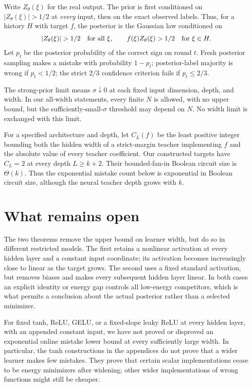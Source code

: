\documentclass[11pt]{article}
\theoremstyle{remark}\newtheorem{remark}[theorem]{Remark}
\begin{document}
Write $Z_\theta(\xi)$ for the real output. The prior is first conditioned
on $|Z_\theta(\xi)|>1/2$ at \emph{every} input, then on the exact observed
labels. Thus, for a history $H$ with target $f$, the posterior is the
Gaussian law conditioned on
\[
 |Z_\theta(\xi)|>1/2\quad\hbox{for all }\xi,\qquad
 f(\xi)Z_\theta(\xi)>1/2\quad\hbox{for }\xi\in H.
\]
Let $p_t$ be the posterior probability of the correct sign on round $t$.
Fresh posterior sampling makes a mistake with probability $1-p_t$;
posterior-label majority is wrong if $p_t<1/2$; the strict $2/3$
confidence criterion fails if $p_t\le2/3$.

The strong-prior limit means $\sigma\downarrow0$ at each fixed input
dimension, depth, and width. In our all-width statements, every finite
$N$ is allowed, with no upper bound, but the sufficiently-small-$\sigma$
threshold may depend on $N$. No width limit is exchanged with this limit.

For a specified architecture and depth, let $C_L(f)$ be the least
positive integer bounding both the hidden width of a strict-margin
teacher implementing $f$ and the absolute value of every teacher
coefficient. Our constructed targets have $C_L=2$ at every depth
$L\ge k+2$. Their bounded-fan-in Boolean circuit size is $\Theta(k)$.
Thus the exponential mistake count below is exponential in Boolean
circuit size, although the neural teacher depth grows with $k$.






\section{What remains open}

The two theorems remove the upper bound on learner width, but do so in
different restricted models. The first retains a nonlinear activation
at every hidden layer and a constant input coordinate; its activation
becomes increasingly close to linear as the target grows. The second
uses a fixed standard activation, but removes biases and makes every
subsequent hidden layer linear. In both cases an explicit identity or
energy gap controls all low-energy competitors, which is what permits
a conclusion about the actual posterior rather than a selected minimizer.

For fixed tanh, ReLU, GELU, or a fixed-slope leaky ReLU at every hidden
layer, with an appended constant input, we have not proved or disproved
an exponential online mistake lower bound at every sufficiently large
width. In particular, the tanh constructions in the appendices do not
prove that a wider learner makes few mistakes. They prove that certain
scalar implementations cease to be energy minimizers after widening;
other wider implementations of wrong functions might still be cheaper.
\end{document}
